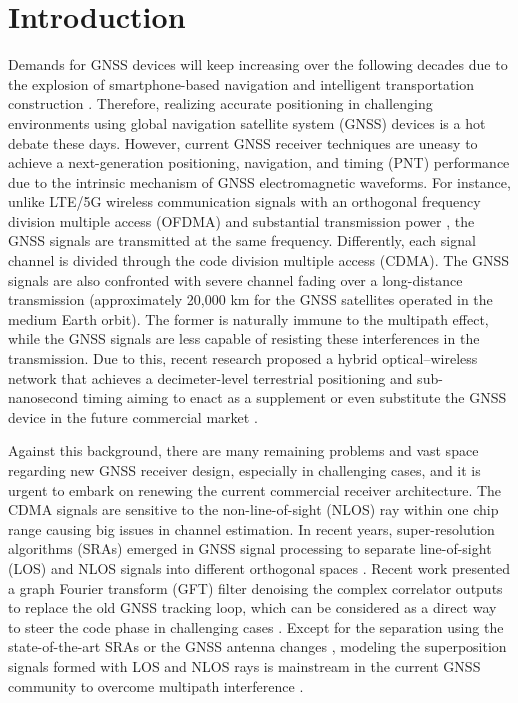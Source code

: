 \documentclass{article}
\begin{document}
\section{Introduction}
Demands for GNSS devices will keep increasing over the following decades due to the explosion of smartphone-based navigation \cite{Sharma2020} and intelligent transportation construction \cite{Zhang2020}. Therefore, realizing accurate positioning in challenging environments using global navigation satellite system (GNSS) devices is a hot debate these days. However, current GNSS receiver techniques are uneasy to achieve a next-generation positioning, navigation, and timing (PNT) performance due to the intrinsic mechanism of GNSS electromagnetic waveforms. For instance, unlike LTE/5G wireless communication signals with an orthogonal frequency division multiple access (OFDMA) and substantial transmission power \cite{Liu2014a,Cimini1985}, the GNSS signals are transmitted at the same frequency. Differently, each signal channel is divided through the code division multiple access (CDMA). The GNSS signals are also confronted with severe channel fading over a long-distance transmission (approximately 20,000 km for the GNSS satellites operated in the medium Earth orbit). The former is naturally immune to the multipath effect, while the GNSS signals are less capable of resisting these interferences in the transmission. Due to this, recent research proposed a hybrid optical--wireless network that achieves a decimeter-level terrestrial positioning and sub-nanosecond timing aiming to enact as a supplement or even substitute the GNSS device in the future commercial market \cite{Koelemeij2022}. 

Against this background, there are many remaining problems and vast space regarding new GNSS receiver design, especially in challenging cases, and it is urgent to embark on renewing the current commercial receiver architecture. The CDMA signals are sensitive to the non-line-of-sight (NLOS) ray within one chip range causing big issues in channel estimation. In recent years, super-resolution algorithms (SRAs) emerged in GNSS signal processing to separate line-of-sight (LOS) and NLOS signals into different orthogonal spaces \cite{Krasner2022,Luo2021sra,DaRosaZanatta2020}. Recent work presented a graph Fourier transform (GFT) filter denoising the complex correlator outputs to replace the old GNSS tracking loop, which can be considered as a direct way to steer the code phase in challenging cases \cite{Luo2022}. Except for the separation using the state-of-the-art SRAs or the GNSS antenna changes \cite{Suzuki2020,Hong2020,Daneshmand2013}, modeling the superposition signals formed with LOS and NLOS rays is mainstream in the current GNSS community to overcome multipath interference \cite{Lau2007,Yan2022,Smolyakov2020}. 
\end{document}

